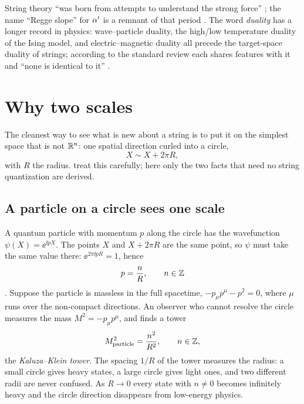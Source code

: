 \begin{historybox}
String theory ``was born from attempts to understand the strong force''
; the name ``Regge slope'' for $\alpha'$ is a remnant of that
period . The word \emph{duality} has a longer record in
physics: wave--particle duality, the high/low temperature duality of the Ising model, and
electric--magnetic duality all precede the target-space duality of strings; according to
the standard review each shares features with it and ``none is identical to it''
.
\end{historybox}

\section{Why two scales}\label{sec:intro:twoscales}

The cleanest way to see what is new about a string is to put it on the simplest space that is
not $\mathbb{R}^n$: one spatial direction curled into a circle,
\begin{equation}\label{eq:intro:circle}
  X\sim X+2\pi R ,
\end{equation}
with $R$ the radius.  treat this carefully; here only the two
facts that need no string quantization are derived.

\subsection{A particle on a circle sees one scale}

A quantum particle with momentum $p$ along the circle has the wavefunction
$\psi(X)=\ee^{\ii pX}$. The points $X$ and $X+2\pi R$ are the same point, so $\psi$ must take
the same value there: $\ee^{2\pi\ii pR}=1$, hence
\begin{equation}\label{eq:intro:momentum}
  p=\frac{n}{R},\qquad n\in\mathbb{Z}
\end{equation}
. Suppose the particle is massless in the full spacetime,
$-p_\mu p^\mu-p^2=0$, where $\mu$ runs over the non-compact directions. An observer who
cannot resolve the circle measures the mass $M^2=-p_\mu p^\mu$, and finds a tower
\begin{equation}\label{eq:intro:kk}
  M^2_{\text{particle}}=\frac{n^2}{R^2},\qquad n\in\mathbb{Z} ,
\end{equation}
the \emph{Kaluza--Klein tower}. The spacing $1/R$ of the tower
measures the radius: a small circle gives heavy states, a large circle gives light ones, and
two different radii are never confused. As $R\to0$ every state with $n\neq0$ becomes
infinitely heavy and the circle direction disappears from low-energy physics.

